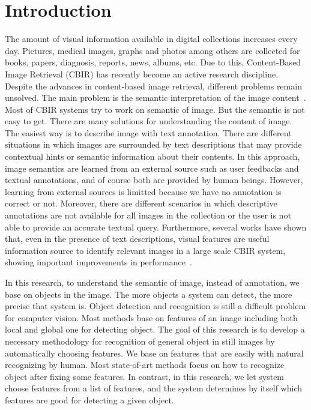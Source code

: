 \section{Introduction}
\label{sec:introduction}
The amount of visual information available in digital collections
increases every day. Pictures, medical images, graphs and photos
among others are collected for books, papers, diagnosis, reports,
news, albums, etc. Due to this, Content-Based Image Retrieval
(CBIR) has recently become an active research discipline. Despite
the advances in content-based image retrieval, different problems
remain unsolved. The main problem is the semantic interpretation of
the image content~\cite{smeulders2000content}. Most of CBIR systems try to work on
semantic of image. But the semantic is not easy to get. There are
many solutions for understanding the content of image. The easiest
way is to describe image with text annotation. There are different
situations in which images are surrounded by text descriptions that
may provide contextual hints or semantic information about their
contents. In this approach, image semantics are learned from an
external source such as user feedbacks and textual annotations, and
of course both are provided by human beings. 
However, learning from external sources is limitted because we have no
annotation is correct or not. Moreover, there are different scenarios
in which descriptive annotations are not available for all images in
the collection or the user is not able to provide an accurate textual
query. Furthermore, several works have shown that, even in the
presence of text descriptions, visual features are useful
information source to identify relevant images in a large scale CBIR
system, showing important improvements in performance~\cite{jing2007canoical,grubinger2008advances}.

In this research, to understand the semantic of image, instead of
annotation, we base on objects in the image. The more objects a
system can detect, the more precise that system is. Object detection
and recognition is still a difficult problem for computer vision. Most
methods base on features of an image including both local and
global one for detecting object. The goal of this research is to
develop a necessary methodology for recognition of general object
in still images by automatically choosing features. We base on
features that are easily with natural recognizing by human. Most
state-of-art methods focus on how to recognize object after fixing
some features. In contrast, in this research, we let system choose
features from a list of features, and the system determines by itself
which features are good for detecting a given object.

